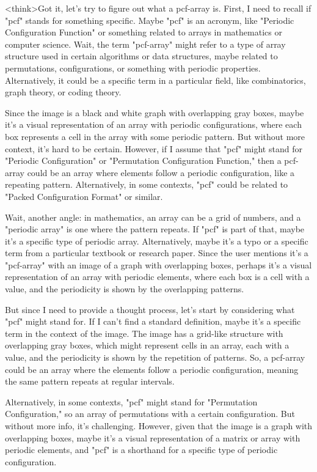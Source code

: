 <think>Got it, let's try to figure out what a pcf-array is. First, I need to recall if "pcf" stands for something specific. Maybe "pcf" is an acronym, like "Periodic Configuration Function" or something related to arrays in mathematics or computer science. Wait, the term "pcf-array" might refer to a type of array structure used in certain algorithms or data structures, maybe related to permutations, configurations, or something with periodic properties. Alternatively, it could be a specific term in a particular field, like combinatorics, graph theory, or coding theory. 

Since the image is a black and white graph with overlapping gray boxes, maybe it's a visual representation of an array with periodic configurations, where each box represents a cell in the array with some periodic pattern. But without more context, it's hard to be certain. However, if I assume that "pcf" might stand for "Periodic Configuration" or "Permutation Configuration Function," then a pcf-array could be an array where elements follow a periodic configuration, like a repeating pattern. Alternatively, in some contexts, "pcf" could be related to "Packed Configuration Format" or similar. 

Wait, another angle: in mathematics, an array can be a grid of numbers, and a "periodic array" is one where the pattern repeats. If "pcf" is part of that, maybe it's a specific type of periodic array. Alternatively, maybe it's a typo or a specific term from a particular textbook or research paper. Since the user mentions it's a "pcf-array" with an image of a graph with overlapping boxes, perhaps it's a visual representation of an array with periodic elements, where each box is a cell with a value, and the periodicity is shown by the overlapping patterns. 

But since I need to provide a thought process, let's start by considering what "pcf" might stand for. If I can't find a standard definition, maybe it's a specific term in the context of the image. The image has a grid-like structure with overlapping gray boxes, which might represent cells in an array, each with a value, and the periodicity is shown by the repetition of patterns. So, a pcf-array could be an array where the elements follow a periodic configuration, meaning the same pattern repeats at regular intervals. 

Alternatively, in some contexts, "pcf" might stand for "Permutation Configuration," so an array of permutations with a certain configuration. But without more info, it's challenging. However, given that the image is a graph with overlapping boxes, maybe it's a visual representation of a matrix or array with periodic elements, and "pcf" is a shorthand for a specific type of periodic configuration. 

